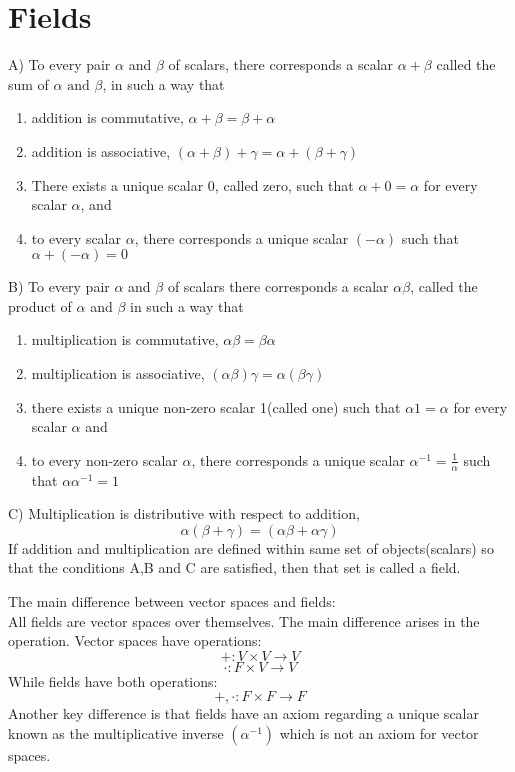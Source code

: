 \documentclass{report}
\begin{document}
\section{Fields}
A) To every pair $\alpha$ and $\beta$ of scalars, there corresponds a scalar $\alpha + \beta$ called the sum of $\alpha \text{ and } \beta$, in such a way that 
\begin{enumerate}
	\item addition is commutative, $\alpha + \beta = \beta + \alpha$
	\item addition is associative, $(\alpha + \beta)+\gamma = \alpha + (\beta + \gamma)$   
	\item There exists a unique scalar 0, called zero, such that $\alpha + 0 = \alpha$ for every scalar $\alpha$, and 
	\item to every scalar $\alpha$, there corresponds a unique scalar $(-\alpha)$ such that $\alpha + (-\alpha) = 0$ 
\end{enumerate}
B) To every pair $\alpha$ and $\beta$ of scalars there corresponds a scalar $\alpha\beta$, called the product of $\alpha$ and $\beta$ in such a way that
\begin{enumerate}
    \item multiplication is commutative, $\alpha\beta = \beta\alpha$
    \item multiplication is associative, $(\alpha\beta)\gamma = \alpha(\beta\gamma)$
    \item there exists a unique non-zero scalar 1(called one) such that $\alpha 1 = \alpha$ for every scalar $\alpha$ and
    \item to every non-zero scalar $\alpha$, there corresponds a unique scalar $\alpha^{-1} = \frac{1}{\alpha}$ such that $\alpha \alpha^{-1} = 1$
\end{enumerate}
C) Multiplication is distributive with respect to addition,
\[
    \alpha(\beta + \gamma) = (\alpha\beta + \alpha \gamma )
\]
If addition and multiplication are defined within same set of objects(scalars) so that the conditions A,B and C are satisfied, then that set is called a field.

\begin{note}
    The main difference between vector spaces and fields: \\
    All fields are vector spaces over themselves. 
    The main difference arises in the operation. 
    Vector spaces have operations:
    \[
        +: V \times V \rightarrow V
    \]
    \[
        \cdot : F \times V \rightarrow V
    \]
    While fields have both operations:
    \[
        +, \cdot : F \times F \rightarrow F
    \]
    Another key difference is that fields have an axiom regarding a unique scalar known as the multiplicative inverse $(\alpha^{-1})$ which is not an axiom for vector spaces.
\end{note}
\end{document}
